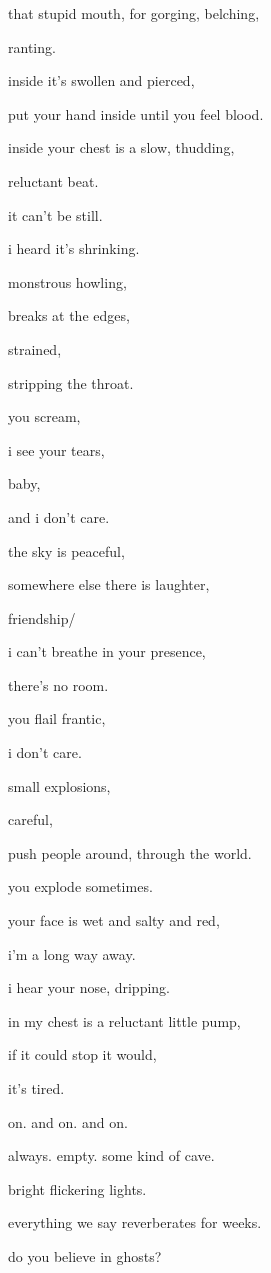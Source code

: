 \documentclass{article}
\begin{document}
	that stupid mouth, for gorging, belching,

	ranting.

	inside it's swollen and pierced,

	put your hand inside until you feel blood.\newpage

	inside your chest is a slow, thudding, 

	reluctant beat.

	it can't be still.

	i heard it's shrinking.

	\newpage
	monstrous howling,

	breaks at the edges,

	strained,

	stripping the throat.\newpage

	you scream,

	i see your tears,

	baby,

	and i don't care.\newpage

	the sky is peaceful,

	somewhere else there is laughter,

	friendship/

	\newpage

	i can't breathe in your presence, 

	there's no room.

	you flail frantic,

	i don't care.\newpage

	small explosions,

	careful,

	push people around, through the world.

	you explode sometimes.\newpage

	your face is wet and salty and red,

	i'm a long way away.

	i hear your nose, dripping.\newpage

	in my chest is a reluctant little pump,

	if it could stop it would,

	it's tired.

	on. and on. and on.

	always.\newpage
	empty.\newpage
	some kind of cave.

	bright flickering lights.

	everything we say reverberates for weeks.\newpage

	do you believe in ghosts?
\end{document}
